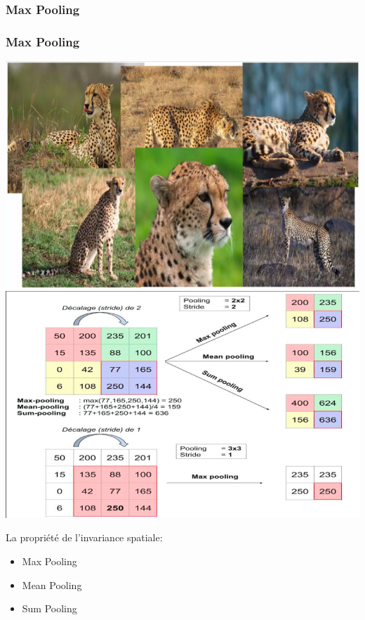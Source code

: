 \documentclass[11pt]{beamer}
\begin{document}
\subsubsection{Max Pooling}
\begin{frame}
\frametitle{Max Pooling}
\includegraphics[scale=0.17]{img14.png}
\includegraphics[scale=0.17]{img15.png}

La propriété de l'invariance spatiale:
\begin{itemize}
	\item Max Pooling
	\item Mean Pooling
	\item Sum Pooling
\end{itemize}
\end{frame}
\end{document}
